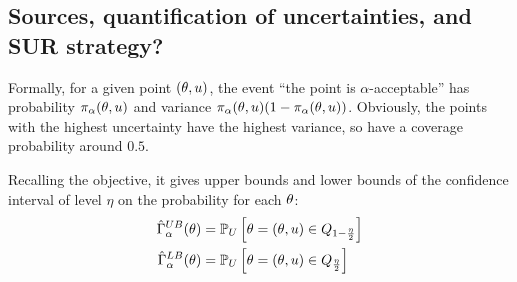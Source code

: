 \documentclass[../../Main_ManuscritThese.tex]{subfiles}
\newcommand{\IMSE}{\mathop{\mathrm{IMSE}}}
\begin{document}




\subsection{Sources, quantification of uncertainties, and SUR strategy?}
Formally, for a given point $(\theta,u)$, the event ``the point is $\alpha$-acceptable'' has probability $\pi_{\alpha}(\theta,u)$ and variance $\pi_{\alpha}(\theta,u) (1-\pi_{\alpha}(\theta,u))$. Obviously, the points with the highest uncertainty have the highest variance, so have a coverage probability around $0.5$.


Recalling the objective, it gives upper bounds and lower bounds of the confidence interval of level $\eta$ on the probability for each $\theta$:
\begin{align}
  \hat{\Gamma}_{\alpha}^{UB}(\theta) &= \mathbb{P}_U\left[\theta=(\theta,u) \in Q_{1-\frac{\eta}{2}}\right] \\
  \hat{\Gamma}_{\alpha}^{LB}(\theta) &= \mathbb{P}_U\left[\theta=(\theta,u) \in Q_{\frac{\eta}{2}}\right]
\end{align}
\end{document}
